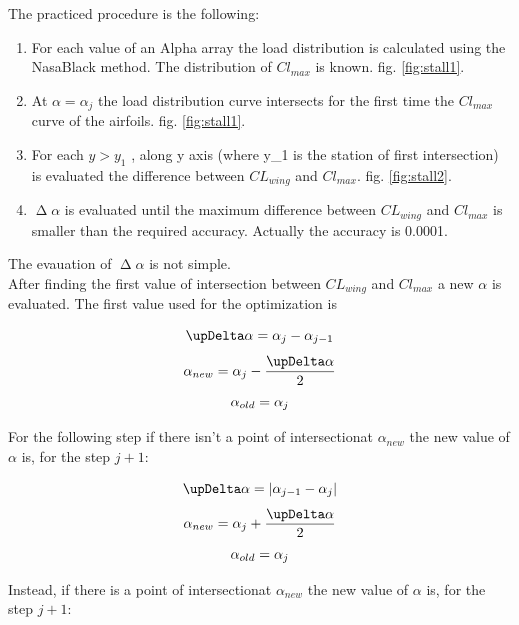 The  practiced procedure is the following:

\begin{enumerate}
\item For each value of an Alpha array the load distribution is calculated using the NasaBlack method.  The distribution of  $Cl_{max}$ is known. fig. \ref{fig:stall1}.
\item At $\alpha = \alpha_j$ the load distribution curve intersects for the first time the $Cl_{max}$ curve of the airfoils. fig. \ref{fig:stall1}.
\item For each $ y > y_1 $ , along y axis (where y_1 is the station of first intersection) is evaluated the difference between $CL_{wing}$ and $Cl_{max}$. fig. \ref{fig:stall2}.
\item $\upDelta \alpha$ is evaluated until the maximum difference between $CL_{wing}$ and $Cl_{max}$ is smaller than the required accuracy. Actually the accuracy is 0.0001. 
\end{enumerate}

The evauation of $\upDelta \alpha$ is not simple.\\
After finding the first value of intersection between $CL_{wing}$ and $Cl_{max}$ a new $\alpha$ is evaluated. The first value used for the optimization is 

\begin{equation}\notag
\upDelta \alpha = \alpha_j -\alpha_{j-1}
\end{equation}
\begin{equation}\notag
\alpha_{new} = \alpha_j - \frac {\upDelta \alpha }{2}
\end{equation}
\begin{equation}\notag
\alpha_{old}= \alpha_j
\end{equation}

For the following step if there isn't a point of intersectionat $\alpha_{new}$ the new value of $\alpha$ is, for the step $j+1$:


\begin{equation}\notag
\upDelta \alpha = |\alpha_{j-1} -\alpha_{j}|
\end{equation}
\begin{equation}\notag
\alpha_{new} = \alpha_{j} + \frac {\upDelta \alpha }{2}
\end{equation}
\begin{equation}\notag
\alpha_{old}= \alpha_j
\end{equation}

Instead,  if there is a point of intersectionat $\alpha_{new}$ the new value of $\alpha$ is, for the step $j+1$:


